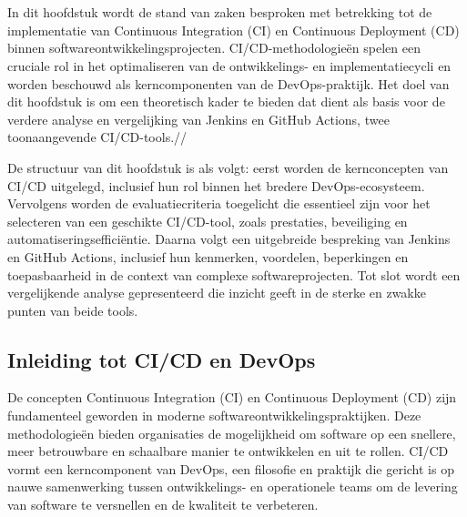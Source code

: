 \chapter{}%
\label{ch:stand-van-zaken}


In dit hoofdstuk wordt de stand van zaken besproken met betrekking tot de implementatie van Continuous Integration (CI) en Continuous Deployment (CD) binnen softwareontwikkelingsprojecten. CI/CD-methodologieën spelen een cruciale rol in het optimaliseren van de ontwikkelings- en implementatiecycli en worden beschouwd als kerncomponenten van de DevOps-praktijk. Het doel van dit hoofdstuk is om een theoretisch kader te bieden dat dient als basis voor de verdere analyse en vergelijking van Jenkins en GitHub Actions, twee toonaangevende CI/CD-tools.//

De structuur van dit hoofdstuk is als volgt: eerst worden de kernconcepten van CI/CD uitgelegd, inclusief hun rol binnen het bredere DevOps-ecosysteem. Vervolgens worden de evaluatiecriteria toegelicht die essentieel zijn voor het selecteren van een geschikte CI/CD-tool, zoals prestaties, beveiliging en automatiseringsefficiëntie. Daarna volgt een uitgebreide bespreking van Jenkins en GitHub Actions, inclusief hun kenmerken, voordelen, beperkingen en toepasbaarheid in de context van complexe softwareprojecten. Tot slot wordt een vergelijkende analyse gepresenteerd die inzicht geeft in de sterke en zwakke punten van beide tools.

\section{Inleiding tot CI/CD en DevOps}

De concepten Continuous Integration (CI) en Continuous Deployment (CD) zijn fundamenteel geworden in moderne softwareontwikkelingspraktijken. Deze methodologieën bieden organisaties de mogelijkheid om software op een snellere, meer betrouwbare en schaalbare manier te ontwikkelen en uit te rollen. CI/CD vormt een kerncomponent van DevOps, een filosofie en praktijk die gericht is op nauwe samenwerking tussen ontwikkelings- en operationele teams om de levering van software te versnellen en de kwaliteit te verbeteren.

